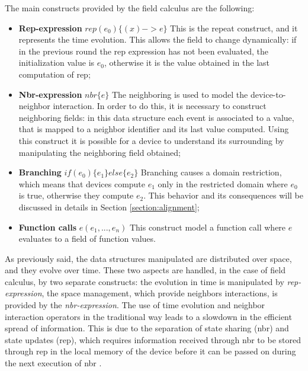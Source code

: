 The main constructs provided by the field calculus are the following:
\begin{itemize}
    \item \textbf{Rep-expression} $rep(e_0)\{(x)-> e\}$ \newline
    This is the repeat construct, and it represents the time evolution. This allows the field to change dynamically: if in the previous round the rep expression has not been evaluated, the initialization value is $e_0$, otherwise it is the value obtained in the last computation of rep;
    \item \textbf{Nbr-expression} $nbr\{e\}$\newline
    The neighboring is used to model the device-to-neighbor interaction. In order to do this, it is necessary to construct neighboring fields: in this data structure each event is associated to a value, that is mapped to a neighbor identifier and its last value computed. Using this construct it is possible for a device to understand its surrounding by manipulating the neighboring field obtained;
    \item \textbf{Branching} $if(e_0)\{e_1\} else \{e_2\}$\newline
    Branching causes a domain restriction, which means that devices compute $e_1$ only in the restricted domain where $e_0$ is true, otherwise they compute $e_2$. This behavior and its consequences will be discussed in details in Section \ref{section:alignment};
    \item \textbf{Function calls} $e(e_1, ..., e_n)$ \newline
    This construct model a function call where $e$ evaluates to a field of function values. 
\end{itemize}

As previously said, the data structures manipulated are distributed over space, and they evolve over time. These two aspects are handled, in the case of field calculus, by two separate constructs: the evolution in time is manipulated by \textit{rep-expression}, the space management, which provide neighbors interactions, is provided by the \textit{nbr-expression}.\newline
The use of time evolution and neighbor interaction operators in the traditional way leads to a slowdown in the efficient spread of information. This is due to the separation of state sharing (nbr) and state updates (rep), which requires information received through nbr to be stored through rep in the local memory of the device before it can be passed on during the next execution of nbr \cite{share_operator}. 

